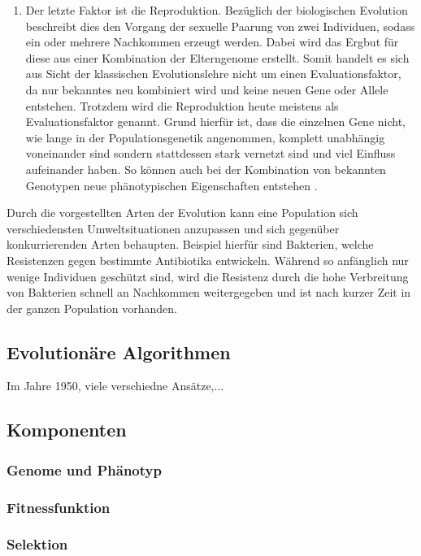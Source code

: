 \begin{enumerate}
	\item Der letzte Faktor ist die Reproduktion. Bezüglich der biologischen Evolution beschreibt dies den Vorgang der sexuelle Paarung von zwei Individuen, sodass ein oder mehrere Nachkommen erzeugt werden. Dabei wird das Ergbut für diese aus einer Kombination der Elterngenome erstellt. Somit handelt es sich aus Sicht der klassischen Evolutionslehre nicht um einen Evaluationsfaktor, da nur bekanntes neu kombiniert wird und keine neuen Gene oder Allele entstehen. Trotzdem wird die Reproduktion heute meistens als Evaluationsfaktor genannt. Grund hierfür ist, dass die einzelnen Gene nicht, wie lange in der Populationsgenetik angenommen, komplett unabhängig voneinander sind sondern stattdessen stark vernetzt sind und viel Einfluss aufeinander haben. So können auch bei der Kombination von bekannten Genotypen neue phänotypischen Eigenschaften entstehen \cite{weicker2015evolutionare}.
\end{enumerate}

Durch die vorgestellten Arten der Evolution kann eine Population sich verschiedensten Umweltsituationen anzupassen und sich gegenüber konkurrierenden Arten behaupten. Beispiel hierfür sind Bakterien, welche Resistenzen gegen bestimmte Antibiotika entwickeln. Während so anfänglich nur wenige Individuen geschützt sind, wird die Resistenz durch die hohe Verbreitung von Bakterien schnell an Nachkommen weitergegeben und ist nach kurzer Zeit in der ganzen Population vorhanden.
 
\subsection{Evolutionäre Algorithmen}
\label{subsec:evolutionary_algorithm}
Im Jahre 1950, viele verschiedne Ansätze,...

\subsection{Komponenten}
\label{subsec:evoltuionary_algorithm_components}
\subsubsection{Genome und Phänotyp}
\subsubsection{Fitnessfunktion}
\subsubsection{Selektion}
